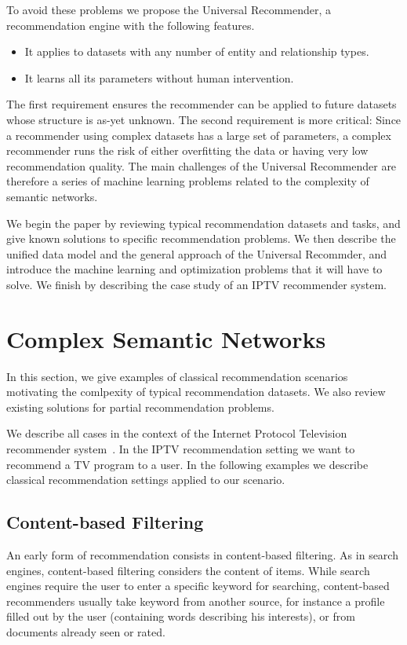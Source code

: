 \documentclass{article}
\begin{document}
To avoid these problems we propose the Universal Recommender, a
recommendation engine with the following features.
\begin{itemize}
\item It applies to datasets with any number of entity and relationship
  types. 
\item It learns all its parameters without human intervention.
\end{itemize}
The first requirement ensures the recommender can be applied to future
datasets whose structure is as-yet unknown.  The second requirement is
more critical:  Since a recommender using complex datasets has a large
set of parameters, a complex recommender runs the risk of either
overfitting the data or having very low recommendation quality. 
The main challenges of the Universal Recommender are therefore a series
of machine learning problems related to the complexity of semantic
networks. 

We begin the paper by reviewing typical recommendation datasets and
tasks, and give known solutions to specific recommendation problems.
We then describe the unified data model and the general approach of the
Universal Recommder, and introduce the machine learning and optimization
problems that it will have to solve.  We finish by describing the case
study of an IPTV recommender system.  

\section{Complex Semantic Networks}
In this section, we give examples of classical recommendation scenarios
motivating the comlpexity of typical recommendation datasets. We also
review existing solutions for partial recommendation problems.  

We describe all cases in the context of the Internet Protocol Television
recommender system~\cite{b430}.  In the IPTV recommendation setting we want
to recommend a TV program to a user.  In the following examples we
describe classical recommendation settings applied to our scenario.  

\subsection{Content-based Filtering}
An early form of recommendation consists in content-based filtering.  As
in search engines, content-based filtering considers the content of
items.  While search engines require the user to enter a specific
keyword for searching, content-based recommenders usually take keyword
from another source, for instance a profile filled out by the user
(containing words describing his interests), or from documents already
seen or rated.
\end{document}
